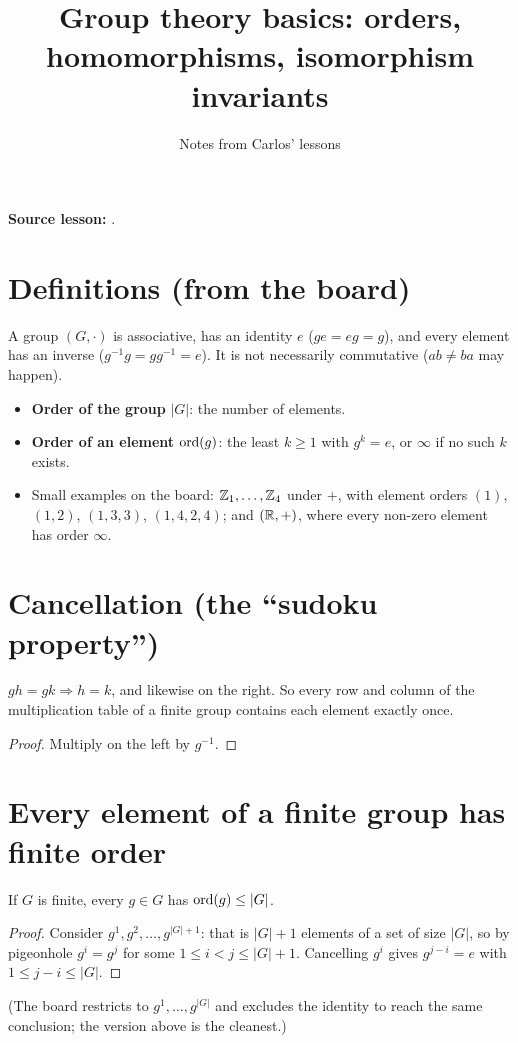 \documentclass[11pt]{article}
\title{Group theory basics: orders, homomorphisms, isomorphism invariants}
\author{Notes from Carlos' lessons}
\date{}
\begin{document}
\maketitle

\textbf{Source lesson:} .

\section*{Definitions (from the board)}

A group $(G,\cdot)$ is associative, has an identity $e$ ($ge=eg=g$), and every element has an inverse ($g^{-1}g=gg^{-1}=e$). It is not necessarily commutative ($ab\ne ba$ may happen).
\begin{itemize}[nosep]
  \item \textbf{Order of the group} $|G|$: the number of elements.
  \item \textbf{Order of an element} $\operatorname{ord}(g)$: the least $k\ge1$ with $g^k=e$, or $\infty$ if no such $k$ exists.
  \item Small examples on the board: $\mathbb{Z}_1,\dots,\mathbb{Z}_4$ under $+$, with element orders $(1)$, $(1,2)$, $(1,3,3)$, $(1,4,2,4)$; and $(\mathbb{R},+)$, where every non-zero element has order $\infty$.
\end{itemize}

\section*{Cancellation (the ``sudoku property'')}

\begin{claim}
$gh=gk\Rightarrow h=k$, and likewise on the right. So every row and column of the multiplication table of a finite group contains each element exactly once.
\end{claim}
\begin{proof}
Multiply on the left by $g^{-1}$.
\end{proof}

\section*{Every element of a finite group has finite order}

\begin{theorem}
If $G$ is finite, every $g\in G$ has $\operatorname{ord}(g)\le|G|$.
\end{theorem}
\begin{proof}
Consider $g^1,g^2,\dots,g^{|G|+1}$: that is $|G|+1$ elements of a set of size $|G|$, so by pigeonhole $g^i=g^j$ for some $1\le i<j\le|G|+1$. Cancelling $g^i$ gives $g^{j-i}=e$ with $1\le j-i\le|G|$.
\end{proof}
(The board restricts to $g^1,\dots,g^{|G|}$ and excludes the identity to reach the same conclusion; the version above is the cleanest.)
\end{document}
